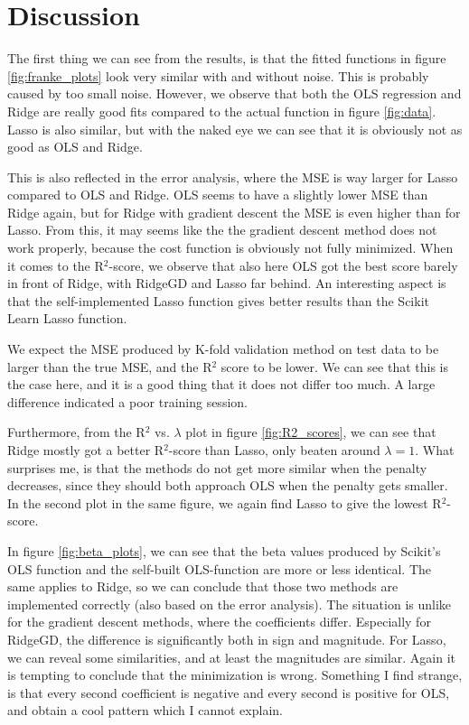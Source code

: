 \section{Discussion} \label{sec:discussion}
The first thing we can see from the results, is that the fitted functions in figure \eqref{fig:franke_plots} look very similar with and without noise. This is probably caused by too small noise. However, we observe that both the OLS regression and Ridge are really good fits compared to the actual function in figure \eqref{fig:data}. Lasso is also similar, but with the naked eye we can see that it is obviously not as good as OLS and Ridge. 

This is also reflected in the error analysis, where the MSE is way larger for Lasso compared to OLS and Ridge. OLS seems to have a slightly lower MSE than Ridge again, but for Ridge with gradient descent the MSE is even higher than for Lasso. From this, it may seems like the the gradient descent method does not work properly, because the cost function is obviously not fully minimized. When it comes to the R$^2$-score, we observe that also here OLS got the best score barely in front of Ridge, with RidgeGD and Lasso far behind. An interesting aspect is that the self-implemented Lasso function gives better results than the Scikit Learn Lasso function.

We expect the MSE produced by K-fold validation method on test data to be larger than the true MSE, and the R$^2$ score to be lower. We can see that this is the case here, and it is a good thing that it does not differ too much. A large difference indicated a poor training session. 

Furthermore, from the R$^2$ vs. $\lambda$ plot in figure \eqref{fig:R2_scores}, we can see that Ridge mostly got a better R$^2$-score than Lasso, only beaten around $\lambda=1$. What surprises me, is that the methods do not get more similar when the penalty decreases, since they should both approach OLS when the penalty gets smaller. In the second plot in the same figure, we again find Lasso to give the lowest R$^2$-score. 

In figure \eqref{fig:beta_plots}, we can see that the beta values produced by Scikit's OLS function and the self-built OLS-function are more or less identical. The same applies to Ridge, so we can conclude that those two methods are implemented correctly (also based on the error analysis). The situation is unlike for the gradient descent methods, where the coefficients differ. Especially for RidgeGD, the difference is significantly both in sign and magnitude. For Lasso, we can reveal some similarities, and at least the magnitudes are similar. Again it is tempting to conclude that the minimization is wrong. Something I find strange, is that every second coefficient is negative and every second is positive for OLS, and obtain a cool pattern which I cannot explain. 

